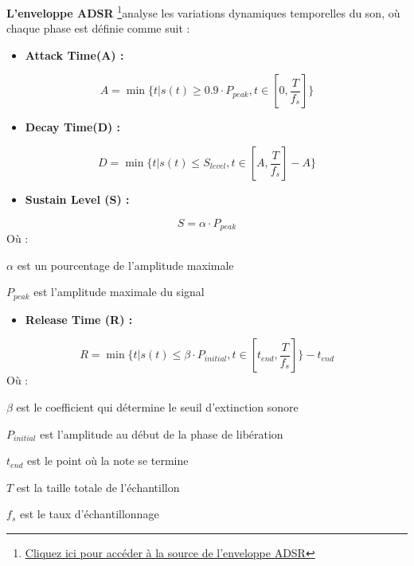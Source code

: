 \textbf{L'enveloppe ADSR }\footnote{\href{https://en.wikipedia.org/wiki/Envelope_(music)}{Cliquez ici pour accéder à la source de l'enveloppe ADSR}}analyse les variations dynamiques temporelles du son, où chaque phase est définie comme suit :
\begin{itemize}
    \item \textbf{Attack Time(A) :}
\end{itemize}
\begin{equation}
    A = \min \{t|s(t)\geq0.9 \cdot P_{peak}, t\in [0, \frac{T}{f_s}]\}
\end{equation}
\begin{itemize}
    \item \textbf{Decay Time(D) :}
\end{itemize}
\begin{equation}
    D = \min \{t|s(t)\leq S_{level}, t\in [A, \frac{T}{f_s}] - A\}
\end{equation}
\begin{itemize}
    \item \textbf{Sustain Level (S) :}
\end{itemize}
\begin{equation}
    S = \alpha \cdot P_{peak}
\end{equation}
Où :
\begin{description}
    \item \(\alpha\) est un pourcentage de l'amplitude maximale
    \item \(P_{peak}\) est l'amplitude maximale du signal
\end{description}
\begin{itemize}
    \item \textbf{Release Time (R) :}
\end{itemize}
\begin{equation}
    R = \min \{t |s(t) \leq \beta \cdot P_{initial}, t \in [t_{end}, \frac{T}{f_s}]  \} - t_{end}
\end{equation}
Où :
\begin{description}
    \item \(\beta\) est le coefficient qui détermine le seuil d'extinction sonore
    \item \(P_{initial}\) est l'amplitude au début de la phase de libération
    \item \(t_{end}\) est le point où la note se termine
    \item \(T\) est la taille totale de l'échantillon
    \item \(f_s\) est le taux d'échantillonnage
\end{description}

